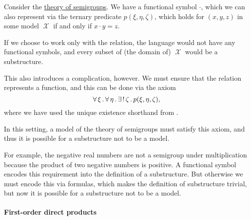 \begin{example}\label{ex:replacing_functional_symbols_via_relations}
  Consider the \hyperref[def:semigroup/theory]{theory of semigroups}. We have a functional symbol \( \cdot \), which we can also represent via the ternary predicate \( p(\xi, \eta, \zeta) \), which holds for \( (x, y, z) \) in some model \( \mscrX \) if and only if \( x \cdot y = z \).

  If we choose to work only with the relation, the language would not have any functional symbols, and every subset of (the domain of) \( \mscrX \) would be a substructure.

  This also introduces a complication, however. We must ensure that the relation represents a function, and this can be done via the axiom
  \begin{equation*}
    \forall \thinspace \xi \thinspace . \thinspace \forall \thinspace \eta \thinspace . \thinspace \exists \thinspace ! \thinspace \zeta \thinspace . \thinspace p(\xi, \eta, \zeta),
  \end{equation*}
  where we have used the unique existence shorthand from .

  In this setting, a model of the theory of semigroups must satisfy this axiom, and thus it is possible for a substructure not to be a model.

  For example, the negative real numbers are not a semigroup under multiplication because the product of two negative numbers is positive. A functional symbol encodes this requirement into the definition of a substructure. But otherwise we must encode this via formulas, which makes the definition of substructure trivial, but now it is possible for a substructure not to be a model.
\end{example}

\paragraph{First-order direct products}

